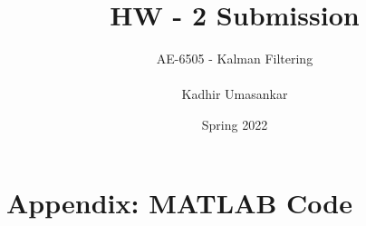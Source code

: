 \documentclass[12pt]{report}
\author{AE-6505 - Kalman Filtering \\\\ Kadhir Umasankar}
\title{HW - 2 Submission}
\date{Spring 2022}
\newlength{\originalVOffset}
\newlength{\originalHOffset}
\theoremstyle{definition}
\begin{document}
\maketitle

\setlength{\voffset}{-0.1cm}
\setlength{\hoffset}{-0.1cm}

\setlength{\voffset}{\originalVOffset}
\setlength{\hoffset}{\originalHOffset}

\section{Appendix: MATLAB Code}
\inputminted[linenos=true, breaklines=true, breakanywhere=true, fontsize=\scriptsize]{MATLAB}{../hw2.m}
\end{document}
